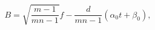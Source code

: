 \begin{equation}
B = \sqrt{\frac{m-1}{mn-1}} f - \frac{d}{mn-1} (\alpha_0 t + \beta_0),
\end{equation}

